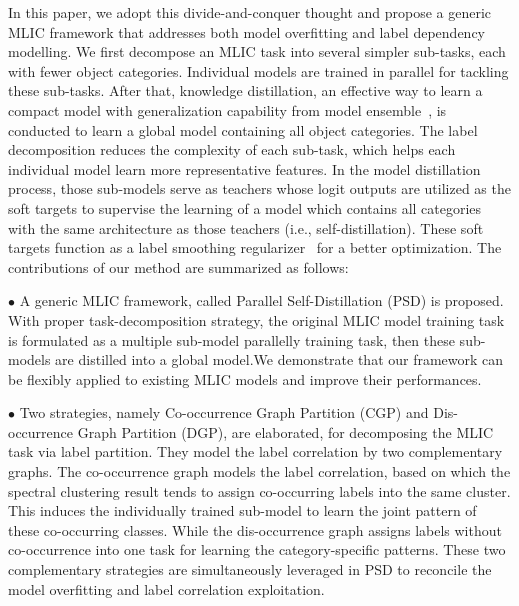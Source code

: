 \documentclass{article}
\begin{document}
In this paper, we adopt this divide-and-conquer thought and propose a generic MLIC framework that addresses both model overfitting and label dependency modelling.
We first decompose an MLIC task into several simpler sub-tasks, each with fewer object categories.
Individual models are trained in parallel for tackling these sub-tasks.
After that, knowledge distillation, an effective way to learn a compact model with generalization capability from model ensemble~\cite{gou2021knowledge}, is conducted to learn a global model containing all object categories.
The label decomposition reduces the complexity of each sub-task, which helps each individual model learn more representative features.
In the model distillation process, those sub-models serve as teachers whose logit outputs are utilized as the soft targets to supervise the learning of a model which contains all categories with the same architecture as those teachers (i.e., self-distillation).
These soft targets function as a label smoothing regularizer~\cite{yuan2020revisiting} for a better optimization.
The contributions of our method are summarized as follows:

$\bullet$ A generic MLIC framework, called Parallel Self-Distillation (PSD) is proposed. With proper task-decomposition strategy, the original MLIC model training task is formulated as a multiple sub-model parallelly training task, then these sub-models are distilled into a global model.We demonstrate that our framework can be flexibly applied to existing MLIC models and improve their performances.

$\bullet$ Two strategies, namely Co-occurrence Graph Partition (CGP) and Dis-occurrence Graph Partition (DGP), are elaborated, for decomposing the MLIC task via label partition. They model the label correlation by two complementary graphs. The co-occurrence graph models the label correlation, based on which the spectral clustering result tends to assign co-occurring labels into the same cluster. This induces the individually trained sub-model to learn the joint pattern of these co-occurring classes. While the dis-occurrence graph assigns labels without co-occurrence into one task for learning the category-specific patterns. These two complementary strategies are simultaneously leveraged in PSD to reconcile the model overfitting and label correlation exploitation.
\end{document}
